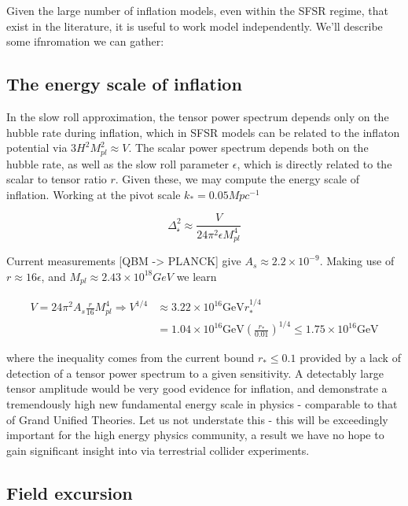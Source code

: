 \documentclass[a4paper,10pt]{article}
\newcommand{\Mp}{M_{pl}}
\begin{document}
Given the large number of inflation models, even within the SFSR regime, that exist in the literature, it is useful to work model independently. We'll describe some ifnromation we can gather:

\subsection{The energy scale of inflation}


In the slow roll approximation, the tensor power spectrum depends only on the hubble rate during inflation, which in SFSR models can be related to the inflaton potential via $3H^2\Mp^2\approx V$. The scalar power spectrum depends both on the hubble rate, as well as the slow roll parameter $\epsilon$, which is directly related to the scalar to tensor ratio $r$. Given these, we may compute the energy scale of inflation. Working at the pivot scale $k_* = 0.05Mpc^{-1}$

\begin{equation}
\Delta^2_{\mathcal{s}}\approx \frac{V}{24\pi^2\epsilon\Mp^4}
\end{equation}

Current measurements [QBM -> PLANCK] give $ A_s \approx 2.2\times10^{-9}$. Making use of $r\approx 16\epsilon$, and $\Mp \approx 2.43\times 10^{18} GeV$ we learn

\begin{equation}\begin{split}
V=24\pi^2A_s\frac{r}{16}\Mp^4 \Rightarrow V^{1/4} &\approx 3.22\times10^{16}\text{GeV}r_*^{1/4}\\
&= 1.04\times10^{16}\text{GeV}(\frac{r_*}{0.01})^{1/4} \leq 1.75\times10^{16}\text{GeV}
\end{split}\end{equation}

where the inequality comes from the current bound $r_*\leq 0.1$ provided by a lack of detection of a tensor power spectrum to a given sensitivity. A detectably large tensor amplitude would be very good evidence for inflation, and demonstrate a tremendously high new fundamental energy scale in physics - comparable to that of Grand Unified Theories. Let us not understate this - this will be exceedingly important for the high energy physics community, a result we have no hope to gain significant insight into via terrestrial collider experiments. 


\subsection{Field excursion}
\end{document}
